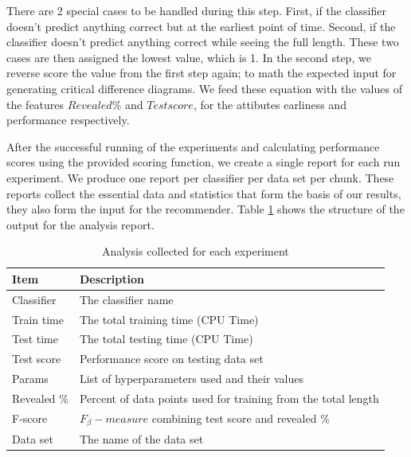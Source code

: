 There are 2 special cases to be handled during this step.
First, if the classifier doesn't predict anything correct but at the earliest point of time.
Second, if the classifier doesn't predict anything correct while seeing the full length.
These two cases are then assigned the lowest value, which is 1.
In the second step, we reverse score the value from the first step again; to math the expected input for generating critical difference diagrams.
We feed these equation with the values of the features $Revealed \%$ and $Test score$, for the attibutes earliness and performance respectively.

After the successful running of the experiments and calculating performance scores using the provided scoring function, we create a single report for each run experiment.
We produce one report per classifier per data set per chunk.
These reports collect the essential data and statistics that form the basis of our results, they also form the input for the recommender.
Table \ref{TableAnalysisReport} shows the structure of the output for the analysis report.

\begin{table}
  \setlength\extrarowheight{2pt} %
  \begin{tabularx}{\textwidth}{|X|X|}
  \hline
  \textbf{Item} & \textbf{Description} \\ \hline
    Classifier                 & The classifier name                                             \\ \hline
    Train time                 & The total training time (CPU Time)                              \\ \hline
    Test time                  & The total testing time (CPU Time)                               \\ \hline
    Test score                 & Performance score on testing data set                           \\ \hline
    Params                     & List of hyperparameters used and their values                   \\ \hline
    Revealed \%                & Percent of data points used for training from the total length  \\ \hline
    F-score                    & $F_{\beta}-measure$ combining test score and revealed \%        \\ \hline
    Data set                   & The name of the data set                                        \\ \hline
  \end{tabularx}
  \caption{Analysis collected for each experiment}
  \label{TableAnalysisReport}
\end{table}

